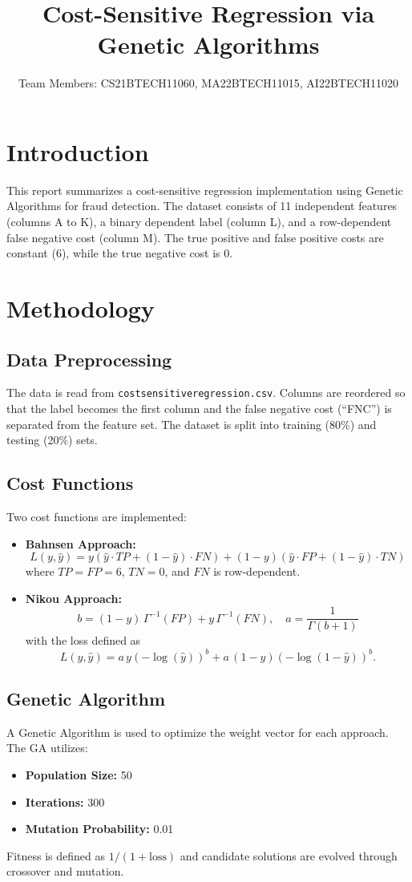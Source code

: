 \documentclass[11pt]{article}
\begin{document}
\title{Cost-Sensitive Regression via Genetic Algorithms}
\author{Team Members: CS21BTECH11060, MA22BTECH11015, AI22BTECH11020}
\maketitle

\section{Introduction}
This report summarizes a cost-sensitive regression implementation using Genetic Algorithms for fraud detection. The dataset consists of 11 independent features (columns A to K), a binary dependent label (column L), and a row-dependent false negative cost (column M). The true positive and false positive costs are constant (6), while the true negative cost is 0.

\section{Methodology}
\subsection{Data Preprocessing}
The data is read from \texttt{costsensitiveregression.csv}. Columns are reordered so that the label becomes the first column and the false negative cost (``FNC'') is separated from the feature set. The dataset is split into training (80\%) and testing (20\%) sets.

\subsection{Cost Functions}
Two cost functions are implemented:
\begin{itemize}
    \item \textbf{Bahnsen Approach:} 
    \[
    L(y, \hat{y}) = y \left(\hat{y} \cdot TP + (1-\hat{y}) \cdot FN\right) + (1-y) \left(\hat{y} \cdot FP + (1-\hat{y}) \cdot TN\right)
    \]
    where \(TP = FP = 6\), \(TN = 0\), and \(FN\) is row-dependent.
    \item \textbf{Nikou Approach:} 
    \[
    b = (1-y)\,\Gamma^{-1}(FP) + y\,\Gamma^{-1}(FN), \quad a = \frac{1}{\Gamma(b+1)}
    \]
    with the loss defined as
    \[
    L(y, \hat{y}) = a\,y\left(-\log(\hat{y})\right)^b + a\,(1-y)\left(-\log(1-\hat{y})\right)^b.
    \]
\end{itemize}

\subsection{Genetic Algorithm}
A Genetic Algorithm is used to optimize the weight vector for each approach. The GA utilizes:
\begin{itemize}
    \item \textbf{Population Size:} 50
    \item \textbf{Iterations:} 300
    \item \textbf{Mutation Probability:} 0.01
\end{itemize}
Fitness is defined as \(1/(1 + \text{loss})\) and candidate solutions are evolved through crossover and mutation.
\end{document}
